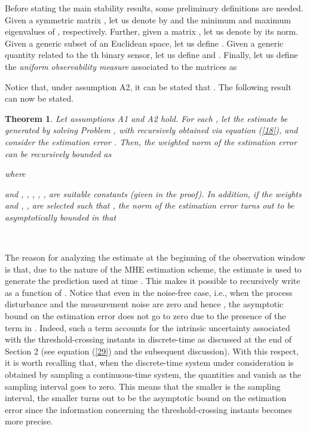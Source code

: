 \documentclass[11pt,journal,onecolumn]{IEEEtran}
\newtheorem{theorem}{Theorem}
\begin{document}
Before stating the main stability results, some preliminary definitions are needed. Given a symmetric matrix , let us denote by  and  the minimum and maximum eigenvalues of , respectively. Further, given a matrix , let us denote by  its norm. Given a generic subset  of an Euclidean space, let us define
. Given a generic quantity  related to the th binary sensor, let us define  and . Finally, let us define the {\em uniform observability measure} associated to the matrices  as

Notice that, under assumption A2, it can be stated that . The following result can now be stated. \vspace{.1 cm}

\begin{theorem}\label{theorem_1}
Let assumptions A1 and A2 hold. For each , let the estimate  be generated by solving Problem , with  recursively obtained via equation (\ref{18}), and consider the estimation error . Then, the weighted norm of the estimation error can be recursively bounded as

where

and , , , , ,  are suitable constants (given in the proof). In addition, if the weights  and , , are selected such that , the norm of the estimation error turns out to be asymptotically bounded in that

\mbox{   }\hfill 
\end{theorem} \vspace{.3 cm}

The reason for analyzing the estimate at the beginning of the observation window is that, due to the nature of the MHE estimation scheme, the estimate  is used to generate the prediction  used at time . This makes it possible to recursively write  as a function of . Notice that even in the noise-free case, i.e., when the process disturbance and the measurement noise are zero and hence , the asymptotic bound  on the estimation error does not go to zero due to the presence of the term  in . Indeed, such a term accounts for the intrinsic uncertainty associated with the threshold-crossing instants in discrete-time as discussed at the end of Section 2 (see equation (\ref{29}) and the subsequent discussion). With this respect, it is worth recalling that, when the discrete-time system under consideration is obtained by sampling a continuous-time system, the quantities  and  vanish as the sampling interval  goes to zero. This means that the smaller is the sampling interval, the smaller turns out to be the asymptotic bound on the estimation error since the information concerning the threshold-crossing instants becomes more precise.
\end{document}
